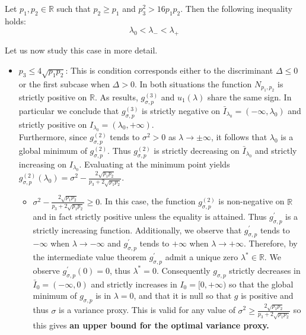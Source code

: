 \documentclass[a4paper, 10pt]{article}
\theoremstyle{definition}
\begin{document}
\begin{manuallemma}
\label{lemma:lambda_ordering}
Let $p_1, p_2 \in \mathbb{R}$ such that $p_2 \geq p_1$ and $p_3^2>16p_1p_2$. Then the following inequality holds:
\[
\lambda_0 <\lambda_- < \lambda_+
\]
\end{manuallemma}
Let us now study this case in more detail. 
\begin{itemize}
    \item $p_3\leq 4\sqrt{p_1p_2}$:  This is condition corresponds either to the discriminant $\Delta \leq  0$ or the first subcase when $\Delta>0$. In both situations the function $N_{p_1, p_2}$ is strictly positive on $\mathbb{R}$. As results, $g^{(3)}_{\sigma,p}$ and $u_1(\lambda)$ share the same sign. In particular we conclude that $g_{\sigma,p}^{(3)}$ is strictly negative on $\bar{I}_{\lambda_0} = (-\infty,\lambda_0)$ and strictly positive on $I_{\lambda_0}= (\lambda_{0}, +\infty)$.\\
    Furthermore, since $g^{(2)}_{\sigma, p}$ tends to $\sigma^2 > 0$ as  $\lambda\to \pm\infty$, it follows that $\lambda_0$ is a global minimum of $g^{(2)}_{\sigma, p}$. Thus $g_{\sigma,p}^{(2)}$ is strictly decreasing on $\bar{I}_{\lambda_{0}}$  and strictly increasing on $I_{\lambda_{0}}$. Evaluating at the minimum point yields  $g^{(2)}_{\sigma,p}(\lambda_{0})=\sigma^2-\frac{2\sqrt{p_1p_2}}{p_3+2\sqrt{p_1p_2}}$. 
    \begin{itemize}
        \item  $\sigma^2-\frac{2\sqrt{p_1p_2}}{p_3+2\sqrt{p_1p_2}} \geq 0$. In this case, the function  $g_{\sigma,p}^{(2)}$ is non-negative on $\mathbb{R}$ and in fact strictly positive unless the equality is attained. Thus $g^{'}_{\sigma,p}$ is a strictly increasing function. Additionally, we observe that $g^{'}_{\sigma,p}$ tends to $-\infty$ when  $\lambda\to -\infty$  and $g^{'}_{\sigma, p}$ tends to $+\infty$ when  $\lambda\to +\infty$. Therefore, by the intermediate value theorem $g_{\sigma, p}^{'}$ admit a unique zero $\lambda^* \in \mathbb{R}$. We observe $g^{'}_{\sigma, p}(0) = 0$, thus $\lambda^*=0$. Consequently $g_{\sigma, p}$ strictly decreases in $\bar{I}_{0}=(-\infty, 0)$ and strictly increases in ${I}_{0} = [0, +\infty)$ so that the global minimum of $g_{\sigma, p}$ is in   $\lambda = 0$, and that it is null so that $g$ is positive and thus $\sigma$ is a variance proxy. This is valid for any value of $\sigma^2\geq \frac{2\sqrt{p_1p_2}}{p_3+2\sqrt{p_1p_2}}$ so this gives \textbf{an upper bound for the optimal variance proxy.} 
        

\end{itemize}
\end{itemize}
\end{document}
